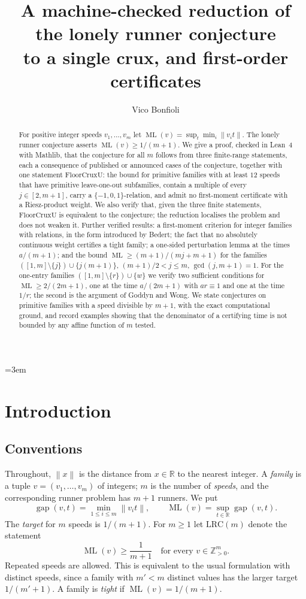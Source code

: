 \documentclass[11pt]{amsart}
\title[A reduction of the lonely runner conjecture]{A machine-checked reduction of the lonely runner conjecture\\ to a single crux, and first-order certificates}
\author{Vico Bonfioli}
\date{}
\theoremstyle{plain}
\theoremstyle{definition}
\theoremstyle{remark}
\newcommand{\nrm}[1]{\left\lVert #1 \right\rVert}
\newcommand{\ML}{\operatorname{ML}}
\newcommand{\gap}{\operatorname{gap}}
\newcommand{\Z}{\mathbb{Z}}
\newcommand{\R}{\mathbb{R}}
\newcommand{\LRC}{\mathrm{LRC}}
\begin{document}
\emergencystretch=3em

\begin{abstract}
For positive integer speeds $v_1,\dots,v_m$ let $\ML(v)=\sup_{t}\min_i\nrm{v_it}$. The lonely
runner conjecture asserts $\ML(v)\ge 1/(m+1)$. We give a proof, checked in Lean~4 with Mathlib, that
the conjecture for all $m$ follows from three finite-range statements, each a consequence of
published or announced cases of the conjecture, together with one statement $\mathrm{FloorCruxU}$: the bound for
primitive families with at least $12$ speeds that have primitive leave-one-out subfamilies,
contain a multiple of every $j\in[2,m+1]$, carry a $\{-1,0,1\}$-relation, and admit no first-moment
certificate with a Riesz-product weight. We also verify that, given the three finite statements,
$\mathrm{FloorCruxU}$ is equivalent to the conjecture; the reduction localises the problem and does
not weaken it. Further verified results: a first-moment criterion for integer families with
relations, in the form introduced by Bedert; the fact that no absolutely continuous weight certifies a
tight family; a one-sided perturbation lemma at the times $a/(m+1)$; and the bound
$\ML\ge (m+1)/(mj+m+1)$ for the families $([1,m]\setminus\{j\})\cup\{j(m+1)\}$,
$(m+1)/2<j\le m$, $\gcd(j,m+1)=1$. For the one-entry families $([1,m]\setminus\{r\})\cup\{w\}$ we
verify two sufficient conditions for $\ML\ge 2/(2m+1)$, one at the time $a/(2m+1)$ with
$ar\equiv1$ and one at the time $1/r$; the second is the argument of Goddyn and Wong. We state
conjectures on primitive families with a speed
divisible by $m+1$, with the exact computational ground, and record examples showing that the
denominator of a certifying time is not bounded by any affine function of $m$ tested.
\end{abstract}

\maketitle

\section{Introduction}

\subsection{Conventions}
Throughout, $\nrm{x}$ is the distance from $x\in\R$ to the nearest integer. A \emph{family} is a
tuple $v=(v_1,\dots,v_m)$ of integers; $m$ is the number of \emph{speeds}, and the corresponding
runner problem has $m+1$ runners. We put
\[
  \gap(v,t)=\min_{1\le i\le m}\nrm{v_it},\qquad \ML(v)=\sup_{t\in\R}\gap(v,t).
\]
The \emph{target} for $m$ speeds is $1/(m+1)$. For $m\ge 1$ let $\LRC(m)$ denote the statement
\[
  \ML(v)\ge \frac1{m+1}\quad\text{for every } v\in\Z_{>0}^m .
\]
Repeated speeds are allowed. This is equivalent to the usual formulation with distinct speeds,
since a family with $m'<m$ distinct values has the larger target $1/(m'+1)$. A family is
\emph{tight} if $\ML(v)=1/(m+1)$.
\end{document}
